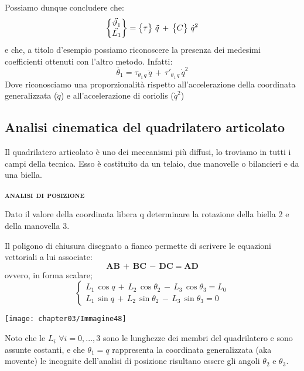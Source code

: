 \begin{enumerate}
 Possiamo dunque concludere che:
 \[
 \begin{Bmatrix}\ddot{\vartheta_1}\\\ddot{L_1}\end{Bmatrix} = \begin{Bmatrix}\tau\end{Bmatrix}\,\ddot{q}\,+\,\begin{Bmatrix}C\end{Bmatrix}\,\dot{q}^2
 \]
 e che, a titolo d'esempio possiamo riconoscere la presenza dei medesimi coefficienti ottenuti con l'altro metodo. Infatti:
 \[
 \ddot{\theta_1} = \tau_{\theta_1\,q}\,\ddot{q}\,+\,\tau'_{\theta_1\,q}\,\dot{q}^2
 \]
 Dove riconosciamo una proporzionalità rispetto all'accelerazione della coordinata generalizzata ($\ddot{q}$) e all'accelerazione di coriolis ($\dot{q}^2$) 
	\end{enumerate}
	
	\subsection{Analisi cinematica del quadrilatero articolato}
	
	Il quadrilatero articolato è uno dei meccanismi più diffusi, lo troviamo in tutti i campi della tecnica. Esso è costituito da un telaio, due manovelle o bilancieri e da una biella.\newline
	
	\begin{center}
		{\scshape{\bfseries analisi di posizione}}
	\end{center}
			
	
	\begin{minipage}{.5\textwidth}
	Dato il valore della coordinata libera q determinare la rotazione della biella 2 e della manovella 3.
	
	 Il poligono di chiusura disegnato a fianco permette di scrivere le equazioni vettoriali a lui associate:
	 \[\mathbf{AB}\,+\,\mathbf{BC}\,-\,\mathbf{DC}=\mathbf{AD}\]
	 ovvero, in forma scalare;
	 \[
	 \begin{cases}
	 	L_1\,\cos{q}\,+\,L_2\,\cos{\theta_2}\,-\,L_3\,\cos{\theta_3} = L_0\\
	 	L_1\,\sin{q}\,+\,L_2\,\sin{\theta_2}\,-\,L_3\,\sin{\theta_3} = 0
	 \end{cases}
	 \]
	\end{minipage}
	\hfill
	\begin{minipage}{.5\textwidth}
	\centering
	\texttt{[image: chapter03/Immagine48]}
	\end{minipage}
	\vspace{1mm}
	
	Noto che le $L_i$  $\forall i = 0,...,3$ sono le lunghezze dei membri del quadrilatero e sono assunte costanti, e che $\theta_1 = q$ rappresenta la coordinata generalizzata (aka movente) le incognite dell'analisi di posizione risultano essere gli angoli $\theta_2$ e $\theta_3$.
	
